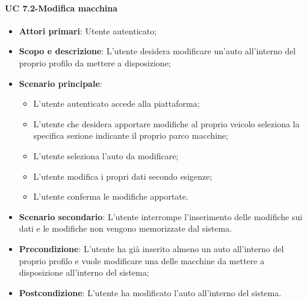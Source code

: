     \paragraph{UC 7.2-Modifica macchina}
    \begin{itemize}
                \item \textbf{Attori primari}: Utente autenticato;
                
                 \item \textbf{Scopo e descrizione}: L'utente desidera modificare un'auto all'interno del proprio profilo da mettere a disposizione;
                 \item \textbf{Scenario principale}:
                 \begin{itemize}
                    \item L'utente autenticato accede alla piattaforma;
                    \item L'utente che desidera apportare modifiche al proprio veicolo seleziona la specifica sezione indicante il proprio parco macchine;
                    \item L'utente seleziona l'auto da modificare;
                    \item L'utente modifica i propri dati secondo esigenze;
                    \item L'utente conferma le modifiche apportate.
                \end{itemize}
                \item \textbf{Scenario secondario}: L'utente interrompe l'inserimento delle modifiche sui dati e le modifiche non vengono memorizzate dal sistema.
                
                 \item \textbf{Precondizione}: L'utente ha già inserito almeno un auto all'interno del proprio profilo e vuole modificare una delle macchine da mettere a disposizione all'interno del sistema;
                 \item \textbf{Postcondizione}: L'utente ha modificato l'auto all'interno del sistema.
                 \end{itemize}
    
